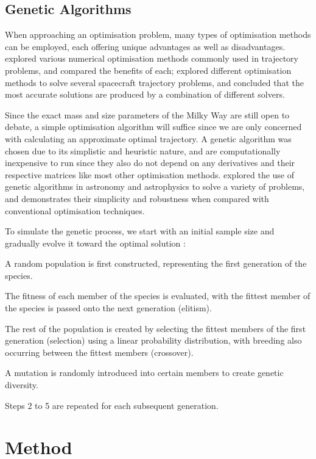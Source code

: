 \documentclass[review]{elsarticle}
\begin{document}
\subsection{Genetic Algorithms}
When approaching an optimisation problem, many types of optimisation methods can be employed, each offering unique advantages as well as disadvantages. \cite{Betts1998} explored various numerical optimisation methods commonly used in trajectory problems, and compared the benefits of each; \cite{Vinko2008} explored different optimisation methods to solve several spacecraft trajectory problems, and concluded that the most accurate solutions are produced by a combination of different solvers. 

Since the exact mass and size parameters of the Milky Way are still open to debate, a simple optimisation algorithm will suffice since we are only concerned with calculating an approximate optimal trajectory. A genetic algorithm was chosen due to its simplistic and heuristic nature, and are computationally inexpensive to run since they also do not depend on any derivatives and their respective matrices like most other optimisation methods. \cite{Charbonneau1995} explored the use of genetic algorithms in astronomy and astrophysics to solve a variety of problems, and demonstrates their simplicity and robustness when compared with conventional optimisation techniques. 

To simulate the genetic process, we start with an initial sample size and gradually evolve it toward the optimal solution \citep{Coley1999}:
\begin{enumerate*}
\item A random population is first constructed, representing the first generation of the species.
\item The fitness of each member of the species is evaluated, with the fittest member of the species is passed onto the next generation (elitism).
\item The rest of the population is created by selecting the fittest members of the first generation (selection) using a linear probability distribution, with breeding also occurring between the fittest members (crossover).
\item A mutation is randomly introduced into certain members to create genetic diversity.
\item Steps 2 to 5 are repeated for each subsequent generation.
\end{enumerate*}

\section{Method}
\end{document}
